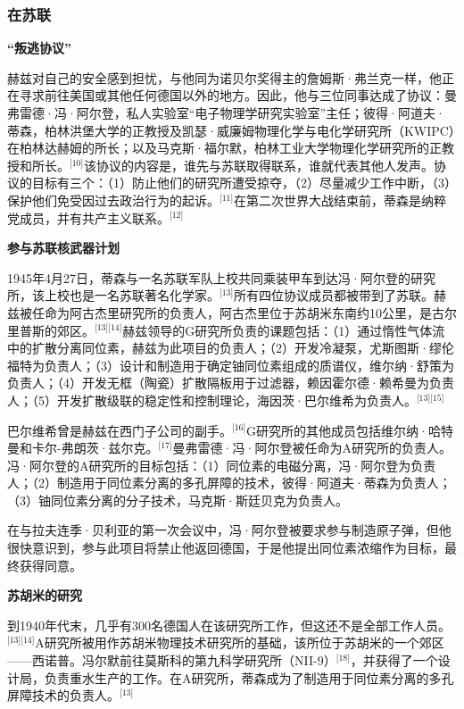 \subsubsection{在苏联}
\textbf{“叛逃协议”}

赫兹对自己的安全感到担忧，与他同为诺贝尔奖得主的詹姆斯·弗兰克一样，他正在寻求前往美国或其他任何德国以外的地方。因此，他与三位同事达成了协议：曼弗雷德·冯·阿尔登，私人实验室“电子物理学研究实验室”主任；彼得·阿道夫·蒂森，柏林洪堡大学的正教授及凯瑟·威廉姆物理化学与电化学研究所（KWIPC）在柏林达赫姆的所长；以及马克斯·福尔默，柏林工业大学物理化学研究所的正教授和所长。\(^\text{[10]}\)该协议的内容是，谁先与苏联取得联系，谁就代表其他人发声。协议的目标有三个：（1）防止他们的研究所遭受掠夺，（2）尽量减少工作中断，（3）保护他们免受因过去政治行为的起诉。\(^\text{[11]}\)在第二次世界大战结束前，蒂森是纳粹党成员，并有共产主义联系。\(^\text{[12]}\)

\textbf{参与苏联核武器计划}

1945年4月27日，蒂森与一名苏联军队上校共同乘装甲车到达冯·阿尔登的研究所，该上校也是一名苏联著名化学家。\(^\text{[13]}\)所有四位协议成员都被带到了苏联。赫兹被任命为阿古杰里研究所的负责人，阿古杰里位于苏胡米东南约10公里，是古尔里普斯的郊区。\(^\text{[13][14]}\)赫兹领导的G研究所负责的课题包括：（1）通过惰性气体流中的扩散分离同位素，赫兹为此项目的负责人；（2）开发冷凝泵，尤斯图斯·缪伦福特为负责人；（3）设计和制造用于确定铀同位素组成的质谱仪，维尔纳·舒策为负责人；（4）开发无框（陶瓷）扩散隔板用于过滤器，赖因霍尔德·赖希曼为负责人；（5）开发扩散级联的稳定性和控制理论，海因茨·巴尔维希为负责人。\(^\text{[13][15]}\)

巴尔维希曾是赫兹在西门子公司的副手。\(^\text{[16]}\)G研究所的其他成员包括维尔纳·哈特曼和卡尔-弗朗茨·兹尔克。\(^\text{[17]}\)曼弗雷德·冯·阿尔登被任命为A研究所的负责人。冯·阿尔登的A研究所的目标包括：（1）同位素的电磁分离，冯·阿尔登为负责人；（2）制造用于同位素分离的多孔屏障的技术，彼得·阿道夫·蒂森为负责人；（3）铀同位素分离的分子技术，马克斯·斯廷贝克为负责人。

在与拉夫连季·贝利亚的第一次会议中，冯·阿尔登被要求参与制造原子弹，但他很快意识到，参与此项目将禁止他返回德国，于是他提出同位素浓缩作为目标，最终获得同意。

\textbf{苏胡米的研究}

到1940年代末，几乎有300名德国人在该研究所工作，但这还不是全部工作人员。\(^\text{[13][14]}\)A研究所被用作苏胡米物理技术研究所的基础，该所位于苏胡米的一个郊区——西诺普。冯尔默前往莫斯科的第九科学研究所（NII-9）\(^\text{[18]}\)，并获得了一个设计局，负责重水生产的工作。在A研究所，蒂森成为了制造用于同位素分离的多孔屏障技术的负责人。\(^\text{[13]}\)


